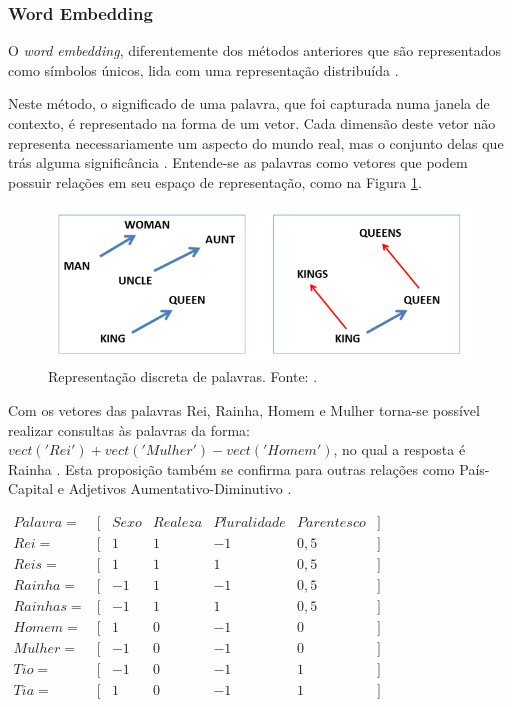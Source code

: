\subsubsection{Word Embedding}

O \textit{word embedding}, diferentemente dos métodos anteriores que são representados como símbolos únicos, lida com uma representação distribuída \cite{GOLDBERG2017}.

Neste método, o significado de uma palavra, que foi capturada numa janela de contexto, é representado na forma de um vetor. Cada dimensão deste vetor não representa necessariamente um aspecto do mundo real, mas o conjunto delas que trás alguma significância \cite{GOLDBERG2017}. Entende-se as palavras como vetores que podem possuir relações em seu espaço de representação, como na Figura \ref{fig:wordtovec}. 

\begin{figure}[h]
	\centering
	\includegraphics[keepaspectratio=true,scale=0.5]{figuras/wordtovec}
    \caption[Representação discreta de palavras]{Representação discreta de palavras. Fonte: \cite[Página 479]{MIKOLOV2013b}.}
    \label{fig:wordtovec}
\end{figure}
Com os vetores das palavras Rei, Rainha, Homem e Mulher torna-se possível realizar consultas às palavras da forma: $vect('Rei') + vect('Mulher') - vect('Homem')$, no qual a resposta é Rainha \cite{MIKOLOV2013b}. Esta proposição também se confirma para outras relações como País-Capital e Adjetivos Aumentativo-Diminutivo \cite{MIKOLOV2013a}.

\begin{center}
    $
    \begin{array}{rlrrrrr}
        \label{ex:we}
        Palavra = & [ & Sexo & Realeza & Pluralidade & Parentesco &] \\ \hline
        Rei = & [ & 1 & 1 & -1 & 0,5 & ]  \\
		Reis = & [ & 1 & 1 & 1 & 0,5 & ]  \\
        Rainha = & [ & -1 & 1 & -1 & 0,5 & ] \\
        Rainhas = & [ & -1 & 1 & 1 & 0,5 & ] \\
        Homem = & [ & 1 & 0 & -1 & 0 & ] \\
        Mulher = & [ & -1 & 0 & -1 & 0 & ] \\
        Tio = & [ & -1 & 0 & -1 & 1 & ] \\
        Tia = & [ & 1 & 0 & -1 & 1 & ] \\
    \end{array}
  	$
\end{center}


